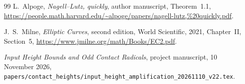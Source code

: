 \documentclass[11pt,a4paper]{article}
\theoremstyle{definition}\newtheorem{definition}[theorem]{Definition}
\theoremstyle{remark}\newtheorem{remark}[theorem]{Remark}
\begin{document}
\begin{thebibliography}{99}
L.~Alpoge, \emph{Nagell--Lutz, quickly}, author manuscript,
Theorem~1.1,
\url{https://people.math.harvard.edu/~alpoge/papers/nagell-lutz,%20quickly.pdf}.

J.~S.~Milne, \emph{Elliptic Curves}, second edition,
World Scientific, 2021, Chapter~II, Section~5,
\url{https://www.jmilne.org/math/Books/EC2.pdf}.

\emph{Input Height Bounds and Odd Contact Radicals},
project manuscript, 10 November 2026,
\nolinkurl{papers/contact_heights/input_height_amplification_20261110_v22.tex}.
\end{thebibliography}
\end{document}
